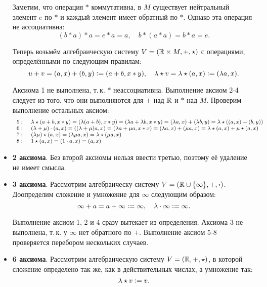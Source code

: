 \begin{remark}
\begin{itemize}
            Заметим, что операция $\ast$ коммутативна, в $M$ существует нейтральный элемент $e$ по $\ast$ и каждый элемент имеет обратный по $\ast$. Однако эта операция не ассоциативна:
            $$
            (b \ast a) \ast a = e \ast a = a,\quad b \ast (a \ast a) = b \ast a = e.
            $$

            Теперь возьмём алгебраическую систему $V = (\mathbb{R} \times M, +, \star)$ с операциями, определёнными по следующим правилам:
            $$
            u + v = (a, x) + (b, y) \vcentcolon = (a + b, x \ast y),\quad \lambda \star v = \lambda \star (a, x) \vcentcolon = (\lambda a, x).
            $$

            Аксиома 1 не выполнена, т.\,к. $\ast$ неассоциативна. Выполнение аксиом 2-4 следует из того, что они выполняются для $+$ над $\mathbb{R}$ и $\ast$ над $M$. Проверим выполнение остальных аксиом:
            $$\footnotesize
            \begin{array}{rl}
                5:\; & \lambda \star (a + b, x \ast y) = (\lambda(a + b), x \ast y) = (\lambda a + \lambda b, x \ast y) = (\lambda a, x) + (\lambda b, y) = \lambda\star((a, x) + (b, y))\\
                6:\; & (\lambda + \mu) \cdot (a, x) = ((\lambda + \mu)a, x) = (\lambda a + \mu a, x \ast x) = (\lambda a, x) + (\mu a, x) = \lambda \star (a, x) + \mu \star (a, x)\\
                7:\; & (\lambda\mu) \star (a, x) = (\lambda\mu a, x) = \lambda \star (\mu a, x)\\
                8:\; & 1 \star (a, x) = (1 \cdot a, x) = (a, x)
            \end{array}
            $$
        \item \textbf{2 аксиома}. Без второй аксиомы нельзя ввести третью, поэтому её удаление не имеет смысла.
        \item \textbf{3 аксиома}. Рассмотрим алгебраическу систему $V = (\mathbb{R} \cup \{\infty\}, +, \boldsymbol{\cdot})$. Доопределим сложение и умножение для $\infty$ следующим образом:
            $$
            \infty + a = a + \infty \vcentcolon = \infty,\quad \lambda \cdot \infty \vcentcolon = \infty.
            $$

            Выполнение аксиом 1, 2 и 4 сразу вытекает из определения. Аксиома 3 не выполнена, т.\,к. у $\infty$ нет обратного по $+$. Выполнение аксиом 5-8 проверяется перебором нескольких случаев.
        \item \textbf{6 аксиома}. Рассмотрим алгебраическую систему $V = (\mathbb{R}, +, \star)$, в которой сложение определено так же, как в действительных числах, а умножение так:
            $$
            \lambda \star v \vcentcolon = v.
            $$


\end{itemize}
\end{remark}
